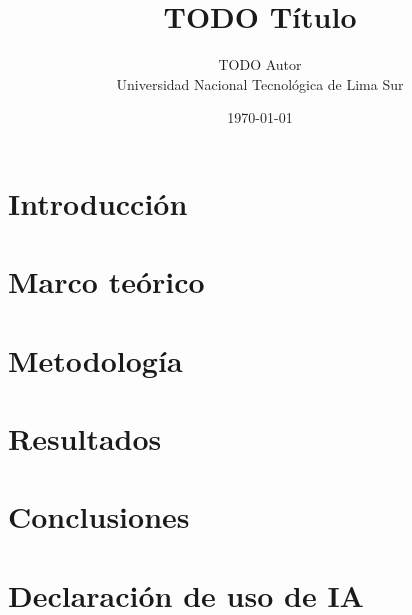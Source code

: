\documentclass[11pt,a4paper,twocolumn]{article}
\title{TODO Título}
\author{TODO Autor\\ Universidad Nacional Tecnológica de Lima Sur}
\date{\today}
\begin{document}

\section{Introducción}
\section{Marco teórico}
\section{Metodología}
\section{Resultados}
\section{Conclusiones}


\appendix
\section{Declaración de uso de IA}
\end{document}

